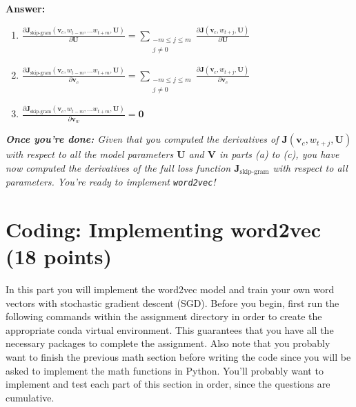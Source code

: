 \documentclass{article}
\newenvironment{answer}{
    {\bf Answer:} \sf \begingroup\color{red}
}{\endgroup}%
\begin{document}
\begin{enumerate}[label=(\alph*)]
\begin{shaded}
\begin{answer}
\begin{enumerate}[label=(\roman*)]
\renewcommand{\theequation}{\roman{equation}}%
\item ${\frac{\partial \bm J_{\textrm{skip-gram}}(\bm v_c, w_{t-m},\ldots w_{t+m}, \bm U)} {\partial \bm U}} = \sum_{\substack{-m\le j \le m \\ j\ne 0}} {\frac{\partial \bm J(\bm v_c, w_{t+j}, \bm U)}{\partial \bm U}}$
\item ${\frac{\partial \bm J_{\textrm{skip-gram}}(\bm v_c, w_{t-m},\ldots w_{t+m}, \bm U)} {\partial \bm v_c}} = \sum_{\substack{-m\le j \le m \\ j\ne 0}} {\frac{\partial \bm J(\bm v_c, w_{t+j}, \bm U)}{\partial \bm v_c}}$
\item ${\frac{\partial \bm J_{\textrm{skip-gram}}(\bm v_c, w_{t-m},\ldots w_{t+m}, \bm U)} {\partial \bm v_w}} = \bm 0$
\end{enumerate}
\end{answer}
\end{shaded}

\textit{\textbf{Once you're done:} Given that you computed the derivatives of $\bm J(\bm v_c, w_{t+j}, \bm U)$ with respect to all the model parameters $\bm U$ and $\bm V$ in parts (a) to (c), you have now computed the derivatives of the full loss function $\bm J_{\text{skip-gram}}$ with respect to all parameters. You're ready to implement \texttt{word2vec}!} %

\end{enumerate}

\section{Coding: Implementing word2vec (18 points)}
In this part you will implement the word2vec model and train your own word vectors with stochastic gradient descent (SGD). Before you begin, first run the following commands within the assignment directory in order to create the appropriate conda virtual environment. This guarantees that you have all the necessary packages to complete the assignment. Also note that you probably want to finish the previous math section before writing the code since you will be asked to implement the math functions in Python. You’ll probably want to implement and test each part of this section in order, since the questions are cumulative.
\end{document}
